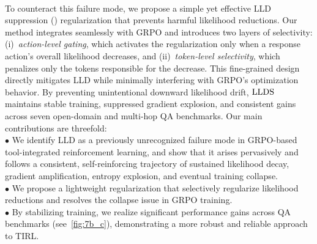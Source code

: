 \\
To counteract this failure mode, we propose a simple yet effective LLD suppression (\ours{}) regularization that prevents harmful likelihood reductions. Our method integrates seamlessly with GRPO and introduces two layers of selectivity: (i)~\emph{action-level gating}, which activates the regularization only when a response action’s overall likelihood decreases, and (ii)~\emph{token-level selectivity}, which penalizes only the tokens responsible for the decrease. This fine-grained design directly mitigates LLD while minimally interfering with GRPO’s optimization behavior. By preventing unintentional downward likelihood drift, $\rm LLDS$ maintains stable training, suppressed gradient explosion, and consistent gains across seven open-domain and multi-hop QA benchmarks. Our main contributions are threefold:
\vspace{1mm}
\\
\noindent$\bullet$ We identify LLD as a previously unrecognized failure mode in GRPO-based tool-integrated reinforcement learning, and show that it arises pervasively and follows a consistent, self-reinforcing trajectory of sustained likelihood decay, gradient amplification, entropy explosion, and eventual training collapse.
\vspace{1mm}
\\
\noindent$\bullet$ We propose a lightweight regularization \ours{} that selectively regularize likelihood reductions and resolves the collapse issue in GRPO training.
\vspace{1mm}
\\
\noindent$\bullet$ By stabilizing training, we realize significant performance gains across QA benchmarks (see~\cref{fig:7b_c}), demonstrating a more robust and reliable approach to TIRL.
